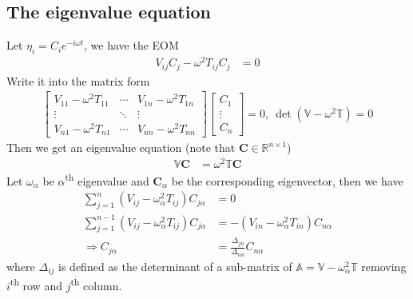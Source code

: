 \documentclass[twoside,9pt]{article}
\numberwithin{equation}{section} %
\theoremstyle{definition}
\theoremstyle{remark}
\begin{document}
\subsection{The eigenvalue equation}
Let $\eta_i = C_ie^{-i\omega t}$, we have the EOM
\begin{align}
    V_{ij}C_j - \omega^2 T_{ij} C_j &= 0
\end{align}
Write it into the matrix form
\begin{align}
    \begin{bmatrix}
        V_{11} - \omega^2T_{11} & \cdots & V_{1n} - \omega^2 T_{1n}\\
        \vdots & \ddots & \vdots \\
        V_{n1} - \omega^2T_{n1} & \cdots & V_{nn} - \omega^2T_{nn}
    \end{bmatrix}
    \begin{bmatrix}
        C_1\\ \vdots\\ C_n
    \end{bmatrix} = 0,~ \det(\mathbb V - \omega^2 \mathbb T) = 0
\end{align}
Then we get an eigenvalue equation (note that $\mathbf{C}\in\mathbb R^{n\times 1}$)
\begin{align}
    \mathbb V\mathbf{C} &= \omega^2\mathbb T\mathbf{C}
\end{align}
Let $\omega_\alpha$ be $\alpha$\textsuperscript{th} eigenvalue
and $\mathbf{C}_\alpha$ be the corresponding eigenvector, then we have
\begin{align}
    \sum_{j=1}^n(V_{ij} - \omega_\alpha^2 T_{ij})C_{j\alpha} &= 0\\
    \sum_{j=1}^{n-1}(V_{ij} - \omega_\alpha^2 T_{ij})C_{j\alpha} &=
    -(V_{in}-\omega_\alpha^2 T_{in})C_{n\alpha}\\
    \Rightarrow
    C_{j\alpha} &= \frac{\Delta_{jn}}{\Delta_{nn}}C_{n\alpha}
\end{align}
where $\Delta_{ij}$ is defined as the determinant of a sub-matrix of
$\mathbb A = \mathbb V - \omega_\alpha^2\mathbb T$ removing
$i$\textsuperscript{th} row and $j$\textsuperscript{th} column.
\end{document}
